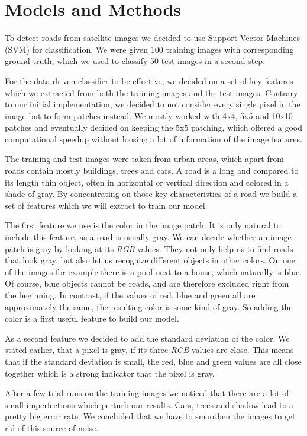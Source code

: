 \documentclass[10pt,conference,compsocconf]{IEEEtran}
\begin{document}
\section{Models and Methods}
To detect roads from satellite images we decided to use Support Vector Machines (SVM) for classification. We were given 100 training images with corresponding ground truth, which we used to classify 50 test images in a second step.

For the data-driven classifier to be effective, we decided on a set of key features which we extracted from both the training images and the test images. Contrary to our initial implementation, we decided to not consider every single pixel in the image but to form patches instead. We mostly worked with 4x4, 5x5 and 10x10 patches and eventually decided on keeping the 5x5 patching, which offered a good computational speedup without loosing a lot of information of the image features.

The training and test images were taken from urban areas, which apart from roads contain mostly buildings, trees and cars. A road is a long and compared to its length thin object, often in horizontal or vertical direction and colored in a shade of gray. By concentrating on those key characteristics of a road we build a set of features which we will extract to train our model.

The first feature we use is the color in the image patch. It is only natural to include this feature, as a road is usually gray. We can decide whether an image patch is gray by looking at its \emph{RGB} values. They not only help us to find roads that look gray, but also let us recognize different objects in other colors. On one of the images for example there is a pool next to a house, which naturally is blue. Of course, blue objects cannot be roads, and are therefore excluded right from the beginning. In contrast, if the values of red, blue and green all are approximately the same, the resulting color is some kind of gray. So adding the color is a first useful feature to build our model. 

As a second feature we decided to add the standard deviation of the color. We stated earlier, that a pixel is gray, if its three \emph{RGB} values are close. This means that if the standard deviation is small, the red, blue and green values are all close together which is a strong indicator that the pixel is gray. 

After a few trial runs on the training images we noticed that there are a lot of small imperfections which perturb our results. Cars, trees and shadow lead to a pretty big error rate. We concluded that we have to smoothen the images to get rid of this source of noise.
\end{document}
